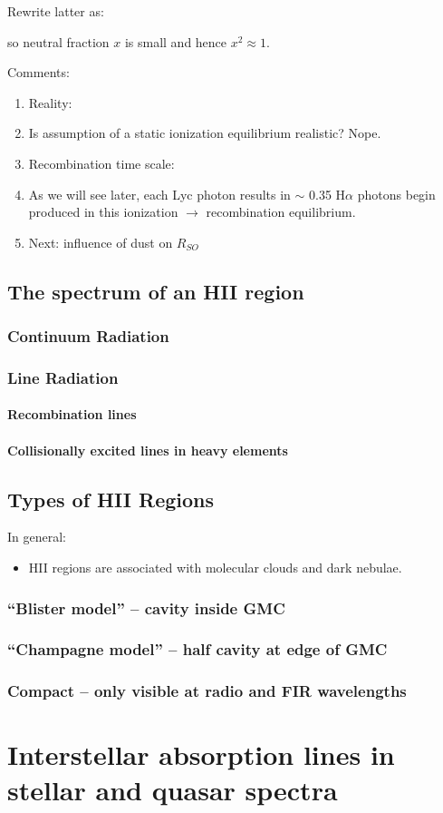 \documentclass[12pt]{article}
\newcommand{\mar}[1]{\hspace{0pt}\marginpar{-{#1}-}}
\begin{document}
\mar{57}Rewrite latter as:$${
}$$

so neutral fraction $x$ is small and hence $x^{2} \approx 1$.

\mar{58}Comments:
\begin{enumerate}
    \item Reality:
    \item Is assumption of a static ionization equilibrium realistic? Nope.
    \item Recombination time scale:
    \item As we will see later, each Lyc photon results in $\sim$ 0.35
        H$\alpha$ photons begin produced in this ionization $\rightarrow$
        recombination equilibrium.
    \item Next: influence of dust on $R_{SO}$
\end{enumerate}

\subsection{The spectrum of an HII region}
\mar{63}
\subsubsection{Continuum Radiation}
\subsubsection{Line Radiation}
\paragraph{Recombination lines}
\paragraph{Collisionally excited lines in heavy elements}

\subsection{Types of HII Regions}
\mar{85}In general:
\begin{itemize}
    \item HII regions are associated with molecular clouds and dark
        nebulae.
\end{itemize}

\subsubsection{``Blister model'' -- cavity inside GMC}
\subsubsection{``Champagne model'' -- half cavity at edge of GMC}
\subsubsection{Compact -- only visible at radio and FIR wavelengths}

\section{Interstellar absorption lines in stellar and quasar spectra}
\end{document}
